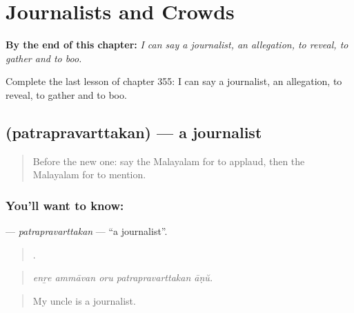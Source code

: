 
\chapter{Journalists and Crowds}
\label{ch:ml-journalists-and-crowds}

\begin{chapteropening}
\textbf{By the end of this chapter:} \emph{I can say a journalist, an allegation, to reveal, to gather and to boo.}

Complete the last lesson of chapter 355: I can say a journalist, an allegation, to reveal, to gather and to boo.
\end{chapteropening}

\section[\texorpdfstring{\ml{പത്രപ്രവർത്തകൻ} (patrapravarttakan)}{പത്രപ്രവർത്തകൻ (patrapravarttakan)}]{ (patrapravarttakan) — a journalist}

\label{lesson:ML-C355-patrapravarttakan}



\begin{quote}
Before the new one: say the Malayalam for to applaud, then the Malayalam for to mention.
\end{quote}

\subsection*{You'll want to know: }
\textbf{} — \emph{patrapravarttakan} — \textquotedblleft{}a journalist\textquotedblright{}.

\begin{quote}
    .
\end{quote}

\begin{quote}
\emph{enṟe ammāvan oru patrapravarttakan āṇŭ.}
\end{quote}

\begin{quote}
My uncle is a journalist.
\end{quote}


